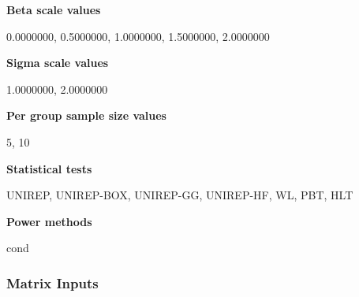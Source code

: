 \documentclass{glimmpse-report}
\begin{document}
{\bf Beta scale values}

0.0000000, 0.5000000, 1.0000000, 1.5000000, 2.0000000

{\bf Sigma scale values}

1.0000000, 2.0000000

{\bf Per group sample size values}

5, 10

{\bf Statistical tests}

UNIREP, UNIREP-BOX, UNIREP-GG, UNIREP-HF, WL, PBT, HLT

{\bf Power methods}

cond

\subsubsection{Matrix Inputs}
\end{document}
